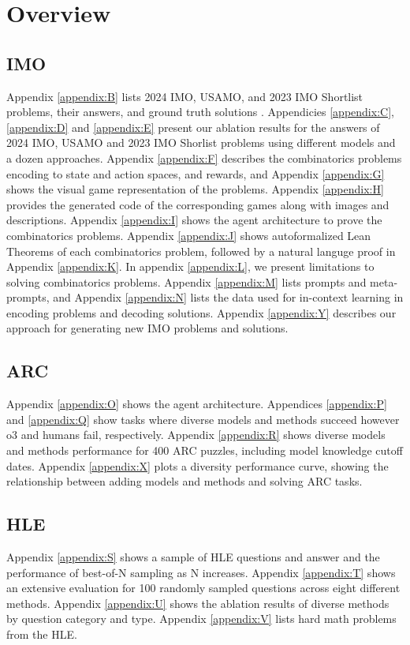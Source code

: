 \section{Overview}
\label{appendix:A}

\subsection*{IMO}

Appendix \ref{appendix:B} lists 2024 IMO, USAMO, and 2023 IMO Shortlist problems, their answers, and ground truth solutions \cite{imo2024problems_and_solutions}\cite{usamo2024problems_and_solutions}\cite{imo2023_shortlist_problems_and_solutions}. Appendicies \ref{appendix:C}, \ref{appendix:D} and \ref{appendix:E} present our ablation results for the answers of 2024 IMO, USAMO and 2023 IMO Shorlist problems using different models and a dozen approaches. Appendix \ref{appendix:F} describes the combinatorics problems encoding to state and action spaces, and rewards, and Appendix \ref{appendix:G} shows the visual game representation of the problems. Appendix \ref{appendix:H} provides the generated code of the corresponding games along with images and descriptions. Appendix \ref{appendix:I} shows the agent architecture to prove the combinatorics problems. Appendix \ref{appendix:J} shows autoformalized Lean Theorems of each combinatorics problem, followed by a natural languge proof in Appendix \ref{appendix:K}. In appendix \ref{appendix:L}, we present limitations to solving combinatorics problems. Appendix \ref{appendix:M} lists prompts and meta-prompts, and Appendix \ref{appendix:N} lists the data used for in-context learning in encoding problems and decoding solutions. Appendix \ref{appendix:Y} describes our approach for generating new IMO problems and solutions.

\subsection*{ARC}
Appendix \ref{appendix:O} shows the agent architecture. Appendices \ref{appendix:P} and \ref{appendix:Q} show tasks where diverse models and methods succeed however o3 and humans fail, respectively. Appendix \ref{appendix:R} shows diverse models and methods performance for 400 ARC puzzles, including model knowledge cutoff dates. Appendix \ref{appendix:X} plots a diversity performance curve, showing the relationship between adding models and methods and solving ARC tasks.

\subsection*{HLE}
Appendix \ref{appendix:S} shows a sample of HLE questions and answer and the performance of best-of-N sampling as N increases. Appendix \ref{appendix:T} shows an extensive evaluation for 100 randomly sampled questions across eight different methods. Appendix \ref{appendix:U} shows the ablation results of diverse methods by question category and type. Appendix \ref{appendix:V} lists hard math problems from the HLE.
